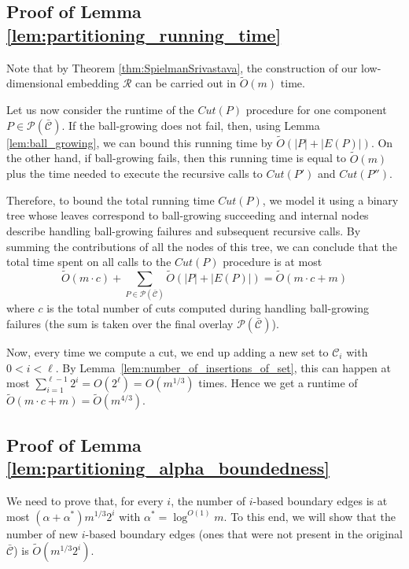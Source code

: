 \documentclass[11pt, letterpaper]{article}
\newcommand{\cC}{\mathcal{C}}
\newcommand{\ocC}{\bar{\mathcal{C}}}
\newcommand{\cP}{\mathcal{P}}
\newcommand{\tO}{\widetilde{O}}
\newcommand{\cR}{\mathcal{R}}
\begin{document}
\subsection{Proof of Lemma \ref{lem:partitioning_running_time}} \label{app:partitioning_running_time}

Note that by Theorem \ref{thm:SpielmanSrivastava}, the construction of our low-dimensional embedding $\cR$ can be carried out in $\tO(m)$ time.

Let us now consider the runtime of the $Cut(P)$ procedure for one component $P \in \cP(\ocC)$. If the ball-growing does not fail, then, using Lemma \ref{lem:ball_growing}, we can bound this running time by $\tO(|P| + |E(P)|)$. On the other hand, if ball-growing fails, then this running time is equal to $\tO(m)$ plus the time needed to execute the recursive calls to $Cut(P')$ and $Cut(P'')$. 

Therefore, to bound the total running time $Cut(P)$, we model it using a binary tree whose leaves correspond to ball-growing succeeding and internal nodes describe handling ball-growing failures and subsequent recursive calls. By summing the contributions of all the nodes of this tree, we can conclude that the total time spent on all calls to the $Cut(P)$ procedure is at most
\[
\tO(m \cdot c) + \sum_{P \in \cP(\ocC)} \tO(|P| + |E(P)|) = \tO(m \cdot c + m)
\] where $c$ is the total number of cuts computed during handling ball-growing failures (the sum is taken over the final overlay $\cP(\ocC)$).

Now, every time we compute a cut, we end up adding a new set to $\cC_i$ with $0 < i < \ell$. By Lemma~\ref{lem:number_of_insertions_of_set}, this can happen at most $\sum_{i=1}^{\ell-1} 2^i = O(2^\ell) = O(m^{1/3})$ times. Hence we get a runtime of $\tO(m\cdot c + m) =\tO(m^{4/3})$.

\subsection{Proof of Lemma \ref{lem:partitioning_alpha_boundedness}} \label{app:partitioning_alpha_boundedness}

We need to prove that, for every $i$, the number of $i$-based boundary edges is at most $(\alpha  + \alpha^*) m^{1/3} 2^i$ with $\alpha^* = \log^{O(1)}m$. To this end, we will show that the number of new $i$-based boundary edges (ones that were not present in the original $\ocC$) is $\tO(m^{1/3} 2^i)$.
\end{document}
